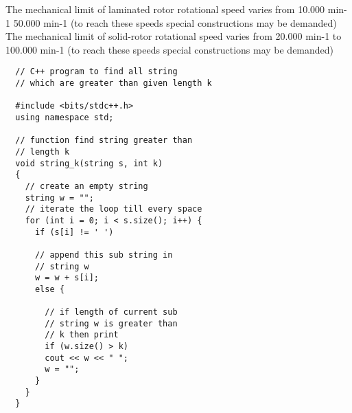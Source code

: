 The mechanical limit of laminated rotor rotational speed varies from 10.000
min-1 50.000 min-1 (to reach these speeds special constructions may be
demanded)
 The mechanical limit of solid-rotor rotational speed varies from 20.000 min-1
to 100.000 min-1 (to reach these speeds special constructions may be
demanded)

\begin{verbatim}   
  // C++ program to find all string
  // which are greater than given length k 
  
  #include <bits/stdc++.h> 
  using namespace std;
  
  // function find string greater than
  // length k
  void string_k(string s, int k) 
  {
    // create an empty string
    string w = "";
    // iterate the loop till every space
    for (int i = 0; i < s.size(); i++) {
      if (s[i] != ' ')
      
      // append this sub string in
      // string w
      w = w + s[i];
      else {
        
        // if length of current sub
        // string w is greater than
        // k then print
        if (w.size() > k)
        cout << w << " ";
        w = "";
      }
    }
  }
\end{verbatim}



